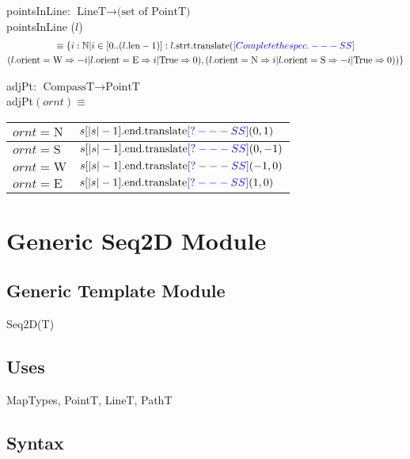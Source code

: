 \documentclass[12pt]{article}
\newcommand{\authornote}[3]{\textcolor{#1}{[#3 ---#2]}}
\newcommand{\authornote}[3]{}
\newcommand{\wss}[1]{\authornote{blue}{SS}{#1}}
\begin{document}
pointsInLine: $\mbox{LineT} \rightarrow \mbox{(set of PointT)}$\\

\noindent pointsInLine ($l$) 
\begin{multline*}
\equiv \{ i: \mathbb{N} | i \in [0
  .. (l.\mbox{len} - 1)] : l.\mbox{strt}.\mbox{translate}(\wss{Complete the spec.}\\
(l.\mbox{orient}=\mbox{W} \Rightarrow -i |
  l.\mbox{orient}=\mbox{E} \Rightarrow i | \mbox{True} \Rightarrow 0), (l.\mbox{orient}=\mbox{N} \Rightarrow i |
  l.\mbox{orient}=\mbox{S} \Rightarrow -i | \mbox{True} \Rightarrow 0) ) \}
\end{multline*}

\noindent adjPt: $\mbox{CompassT} \rightarrow \mbox{PointT}$\\
adjPt$(ornt) \equiv$

\medskip

\begin{tabular}{|l|l|}
\hline
$ornt = \mbox{N}$ & $s[|s|-1].\mbox{end}.\mbox{translate}\wss{?}(0, 1)$\\
\hline
$ornt = \mbox{S}$ & $s[|s|-1].\mbox{end}.\mbox{translate}\wss{?}(0, -1)$\\
\hline
$ornt = \mbox{W}$ & $s[|s|-1].\mbox{end}.\mbox{translate}\wss{?}(-1, 0)$\\
\hline
$ornt = \mbox{E}$ & $s[|s|-1].\mbox{end}.\mbox{translate}\wss{?}(1, 0)$\\
\hline
\end{tabular}

\newpage

\section* {Generic Seq2D Module}

\subsection* {Generic Template Module}

Seq2D(T)

\subsection* {Uses}

MapTypes, PointT, LineT, PathT

\subsection* {Syntax}
\end{document}
